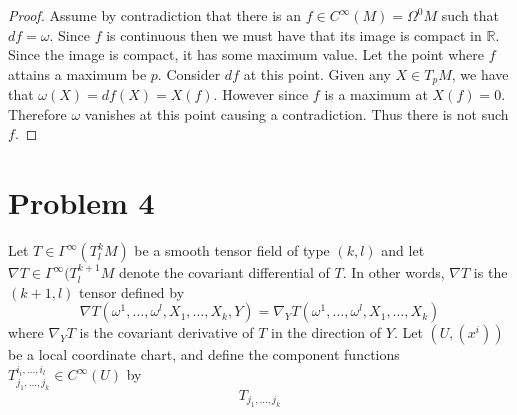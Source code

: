 \documentclass[a4paper]{article}
\begin{document}
\begin{proof}
  Assume by contradiction that there is an $f \in C^\infty(M) = \Omega^0M$ such that $df = \omega$. Since $f$ is continuous then we must have that its image is compact in $\mathds{R}$. Since the image is compact, it has some maximum value. Let the point where $f$ attains a maximum be $p$. Consider $df$ at this point. Given any $X \in T_pM$, we have that $\omega(X) = df(X) = X(f)$. However since $f$ is a maximum at $X(f) = 0$. Therefore $\omega$ vanishes at this point causing a contradiction. Thus there is not such $f$.
\end{proof}

\section*{Problem 4}%
Let $T \in \Gamma^\infty(T_l^kM)$ be a smooth tensor field of type $(k,l)$ and let $\nabla T \in \Gamma^\infty(T_l^{k+1}M$ denote the covariant differential of $T$. In other words, $\nabla T$ is the $(k+1,l)$ tensor defined by
\[
  \nabla T(\omega^1, \dots, \omega^l, X_1, \dots, X_k, Y) = \nabla_Y T(\omega^1, \dots, \omega^l, X_1, \dots, X_k)
\]
where $\nabla_Y T$ is the covariant derivative of $T$ in the direction of $Y$. Let $(U,(x^i))$ be a local coordinate chart, and define the component functions $T_{j_1, \dots, j_k}^{i_i, \dots, i_l} \in C^\infty(U)$ by
\[
  T_{j_1, \dots, j_k} 
\]
\end{document}
